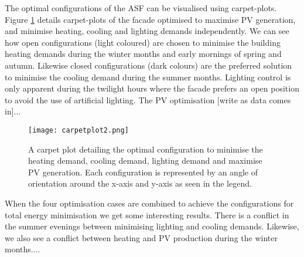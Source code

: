 


The optimal configurations of the ASF can be visualised using carpet-plots. Figure \ref{fig:carpetplot} details carpet-plots of the facade optimised to maximise PV generation, and minimise heating, cooling and lighting demands independently. We can see how open configurations (light coloured) are chosen to minimise the building heating demands during the winter months and early mornings of spring and autumn. Likewise closed configurations (dark colours) are the preferred solution to minimise the cooling demand during the summer months. Lighting control is only apparent during the twilight hours where the facade prefers an open position to avoid the use of artificial lighting. The PV optimisation [write as data comes in]...

\begin{figure}
\begin{center}
\texttt{[image: carpetplot2.png]}
\caption{A carpet plot detailing the optimal configuration to minimise the heating demand, cooling demand, lighting demand and maximise PV generation. Each configuration is represented by an angle of orientation around the x-axis and y-axis as seen in the legend.}
\label{fig:carpetplot}
\end{center}
\end{figure}

When the four optimisation cases are combined to achieve the configurations for total energy minimisation we get some interesting results. There is a conflict in the summer evenings between minimising lighting and cooling demands. Likewise, we also see a conflict between heating and PV production during the winter months....

